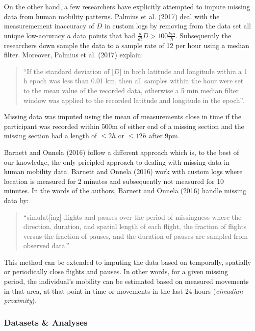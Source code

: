 \documentclass[english,man]{apa6}
\newcounter{author}
\theoremstyle{definition}
\theoremstyle{definition}
\theoremstyle{definition}
\theoremstyle{remark}
\begin{document}
On the other hand, a few researchers have explicitly attempted to impute
missing data from human mobility patterns. Palmius et al. (2017) deal
with the measuremement inaccuracy of \(D\) in custom logs by removing
from the data set all unique low-accuracy \(a\) data points that had
\(\frac{d}{dt}D > 100 \frac{km}{h}\). Subsequently the researchers down
sample the data to a sample rate of 12 per hour using a median filter.
Moreover, Palmius et al. (2017) explain:

\begin{quote}
\enquote{If the standard deviation of {[}\(D\){]} in both latitude and
longitude within a 1 h epoch was less than 0.01 km, then all samples
within the hour were set to the mean value of the recorded data,
otherwise a 5 min median filter window was applied to the recorded
latitude and longitude in the epoch}.
\end{quote}

Missing data was imputed using the mean of measurements close in time if
the participant was recorded within 500m of either end of a missing
section and the missing section had a length of \(\leq 2h\) or
\(\leq 12h\) after 9pm.

Barnett and Onnela (2016) follow a different approach which is, to the
best of our knowledge, the only pricipled approach to dealing with
missing data in human mobility data. Barnett and Onnela (2016) work with
custom logs where location is measured for 2 minutes and subsequently
not measured for 10 minutes. In the words of the authors, Barnett and
Onnela (2016) handle missing data by:

\begin{quote}
\enquote{simulat{[}ing{]} flights and pauses over the period of
missingness where the direction, duration, and spatial length of each
flight, the fraction of flights versus the fraction of pauses, and the
duration of pauses are sampled from observed data.}
\end{quote}

This method can be extended to imputing the data based on temporally,
spatially or periodically close flights and pauses. In other words, for
a given missing period, the individual's mobility can be estimated based
on measured movements in that area, at that point in time or movements
in the last 24 hours (\emph{circadian proximity}).

\subsubsection{Datasets \& Analyses}\label{datasets-analyses}
\end{document}

